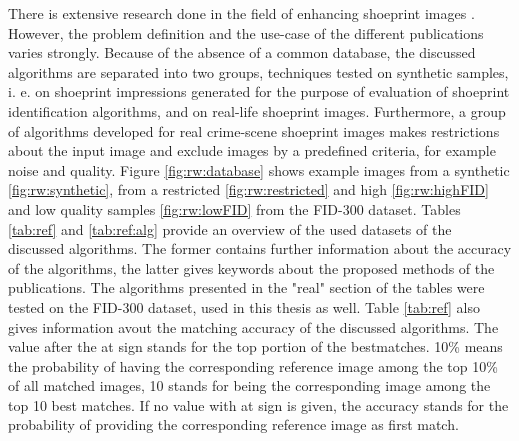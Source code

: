 \documentclass[draft,final]{vutinfth} %
\begin{document}
\par
There is extensive research done in the field of enhancing shoeprint images \cite{rida2019forensic}.
However,  the problem definition and the use-case of the different publications varies strongly.
Because of the absence of a common database, the discussed algorithms are separated into two groups, techniques tested on synthetic samples, i. e. on shoeprint impressions generated for the purpose of evaluation of shoeprint identification algorithms, and on real-life shoeprint images.
Furthermore, a group of algorithms developed for real crime-scene shoeprint images makes restrictions about the input image and exclude images by a predefined criteria, for example noise and quality.
Figure \ref{fig:rw:database} shows example images from a synthetic \ref{fig:rw:synthetic}, from a restricted \ref{fig:rw:restricted} and high \ref{fig:rw:highFID} and low quality samples \ref{fig:rw:lowFID} from the FID-300 dataset.
Tables \ref{tab:ref} and \ref{tab:ref:alg} provide an overview of the used datasets of the discussed algorithms.
The former contains further information about the accuracy of the algorithms, the latter gives keywords about the proposed methods of the publications.
The algorithms presented in the "real" section of the tables were tested on the FID-300 dataset, used in this thesis as well.
Table \ref{tab:ref} also gives information avout the matching accuracy of the discussed algorithms.
The value after the at sign stands for the top portion of the bestmatches.
10\% means the probability of having the corresponding reference image among the top 10\% of all matched images, 10 stands for being the corresponding image among the top 10 best matches.
If no value with at sign is given, the accuracy stands for the probability of providing the corresponding reference image as first match.
\end{document}
